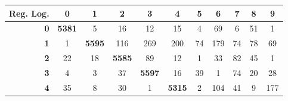 \documentclass[
	12pt,				%
	openright,			%
	twoside,			%
	a4paper,			%
	english,			%
	brazil,				%
	svgnames
	]{abntex2}\usepackage[]{graphicx}\usepackage[]{color}
\begin{document}
\begin{table}[h]
\begin{tabular}{rcccccccccc}
\multicolumn{1}{r|}{\textbf{Reg. Log.}}  & \textbf{0}                         & \textbf{1}                         & \textbf{2}                         & \textbf{3}                         & \textbf{4}                         & \textbf{5}                         & \textbf{6}                         & \textbf{7}                         & \textbf{8}                         & \textbf{9}                         \\ \hline
\multicolumn{1}{r|}{\textbf{0}}          & \multicolumn{1}{c|}{\textbf{5381}} & 5                                  & 16                                 & 12                                 & 15                                 & 4                                  & 69                                 & 6                                  & 51                                 & 1                                  \\ \cline{2-3}
\multicolumn{1}{r|}{\textbf{1}}          & \multicolumn{1}{c|}{1}             & \multicolumn{1}{c|}{\textbf{5595}} & 116                                & 269                                & 200                                & 74                                 & 179                                & 74                                 & 78                                 & 69                                 \\ \cline{3-4}
\multicolumn{1}{r|}{\textbf{2}}          & 22                                 & \multicolumn{1}{c|}{18}            & \multicolumn{1}{c|}{\textbf{5585}} & 89                                 & 12                                 & 1                                  & 33                                 & 82                                 & 45                                 & 1                                  \\ \cline{4-5}
\multicolumn{1}{r|}{\textbf{3}}          & 4                                  & 3                                  & \multicolumn{1}{c|}{37}            & \multicolumn{1}{c|}{\textbf{5597}} & 16                                 & 39                                 & 1                                  & 74                                 & 20                                 & 28                                 \\ \cline{5-6}
\multicolumn{1}{r|}{\textbf{4}}          & 35                                 & 8                                  & 30                                 & \multicolumn{1}{c|}{1}             & \multicolumn{1}{c|}{\textbf{5315}} & 2                                  & 104                                & 41                                 & 9                                  & 177                                \\ \cline{6-7}

\end{tabular}
\end{table}
\end{document}
